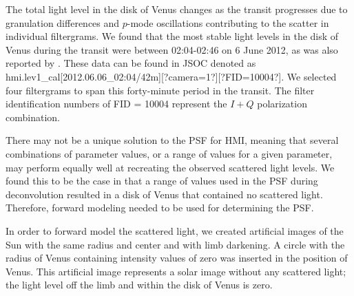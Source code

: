 \documentclass[trackchanges]{aastex62}
\begin{document}
The total light level in the disk of Venus changes as the transit progresses due to granulation differences and $p$-mode oscillations contributing to the scatter in individual filtergrams. We found that the most stable light levels in the disk of Venus during the transit were between 02:04-02:46 on 6 June 2012, as was also reported by \citet{yeo:2014}. These data can be found in JSOC denoted as hmi.lev1\_cal[2012.06.06\_02:04/42m][?camera=1?][?FID=10004?]. We selected four filtergrams to span this forty-minute period in the transit. The filter identification numbers of FID = 10004 represent the $I+Q$ polarization combination.   
 
There may not be a unique solution to the PSF for HMI, meaning that several combinations of parameter values, or a range of values for a given parameter, may perform equally well at recreating the observed scattered light levels. We found this to be the case in that a range of values used in the PSF during deconvolution resulted in a disk of Venus that contained no scattered light.  Therefore, forward modeling needed to be used for determining the PSF. 

In order to forward model the scattered light, we created artificial images of the Sun with the same radius and center and with limb darkening. A circle with the radius of Venus containing intensity values of zero was inserted in the position of Venus. This artificial image represents a solar image without any scattered light; the light level off the limb and within the disk of Venus is zero.
\end{document}
